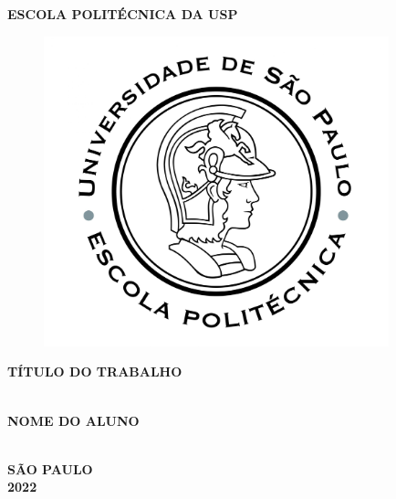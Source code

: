 \thispagestyle{empty}

\vfill
 \begin{center}

    {\large\bfseries ESCOLA POLITÉCNICA DA USP} \\
    \vspace*{1in}
    \begin{figure}[h]
     \centering
            \includegraphics[width=10cm]{figures/Logo_Poli.jpg}\\
     \end{figure}
    \vspace*{1in}
    \large\bfseries{TÍTULO DO TRABALHO} \\
    \vspace*{4cm}
    \noindent \\
    \begin{large} \bfseries NOME DO ALUNO
    \end{large}\\
    \vfill
    \large\bfseries{ SÃO PAULO \\ 2022}
\end{center}

\normalsize